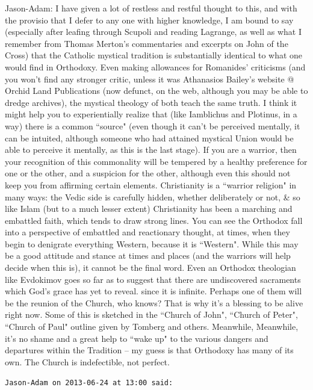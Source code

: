 \begin{footnotesize}
\begin{sffamily}
Jason-Adam: I have given a lot of restless and restful thought to this, and with the provisio that I defer to any one with higher knowledge, I am bound to say (especially after leafing through Scupoli and reading Lagrange, as well as what I remember from Thomas Merton's commentaries and excerpts on John of the Cross) that the Catholic mystical tradition is substantially identical to what one would find in Orthodoxy. Even making allowances for Romanides' criticisms (and you won't find any stronger critic, unless it was Athanasios Bailey's website @ Orchid Land Publications (now defunct, on the web, although you may be able to dredge archives), the mystical theology of both teach the same truth. I think it might help you to experientially realize that (like Iamblichus and Plotinus, in a way) there is a common ``source" (even though it can't be perceived mentally, it can be intuited, although someone who had attained mystical Union would be able to perceive it mentally, as this is the last stage). If you are a warrior, then your recognition of this commonality will be tempered by a healthy preference for one or the other, and a suspicion for the other, although even this should not keep you from affirming certain elements. Christianity is a ``warrior religion" in many ways: the Vedic side is carefully hidden, whether deliberately or not, \& so like Islam (but to a much lesser extent) Christianity has been a marching and embattled faith, which tends to draw strong lines. You can see the Orthodox fall into a perspective of embattled and reactionary thought, at times, when they begin to denigrate everything Western, because it is ``Western". While this may be a good attitude and stance at times and places (and the warriors will help decide when this is), it cannot be the final word. Even an Orthodox theologian like Evdokimov goes so far as to suggest that there are undiscovered sacraments which God's grace has yet to reveal. since it is infinite. Perhaps one of them will be the reunion of the Church, who knows? That is why it's a blessing to be alive right now. Some of this is sketched in the ``Church of John", ``Church of Peter", ``Church of Paul" outline given by Tomberg and others. Meanwhile, Meanwhile, it's no shame and a great help to ``wake up" to the various dangers and departures within the Tradition – my guess is that Orthodoxy has many of its own. The Church is indefectible, not perfect.


\hfill

\texttt{Jason-Adam on 2013-06-24 at 13:00 said: }


\end{sffamily}
\end{footnotesize}

